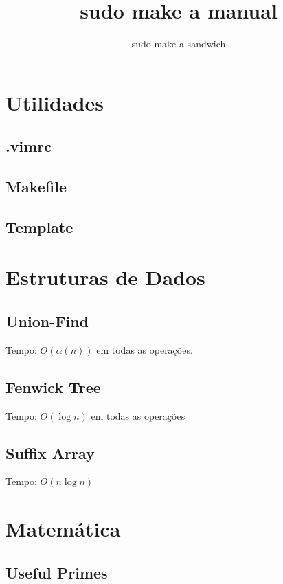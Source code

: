 \documentclass[12pt,a4paper]{article}
\title{sudo make a manual}
\author{sudo make a sandwich}
\begin{document}
	\twocolumn
	\maketitle
	\tableofcontents
	\onecolumn

	\section{Utilidades}
		\subsection{.vimrc}
			
		\subsection{Makefile}
			
		\subsection{Template}
			
	
	\section{Estruturas de Dados}
		\subsection{Union-Find}
			Tempo: \( O(\alpha(n)) \) em todas as operações.
			
		\subsection{Fenwick Tree}
			Tempo: \( O(\log n) \) em todas as operações
			
		\subsection{Suffix Array}
			Tempo: \( O(n \log n) \)
			

	\section{Matemática}
		\subsection{Useful Primes}
			
\end{document}

